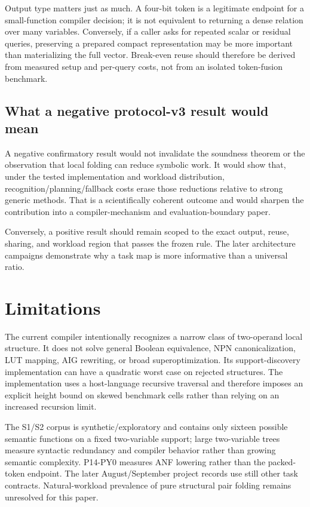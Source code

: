 \documentclass[10pt]{article}
\theoremstyle{plain}
\theoremstyle{definition}
\theoremstyle{remark}
\begin{document}
Output type matters just as much. A four-bit token is a legitimate endpoint for a small-function compiler decision; it is not equivalent to returning a dense relation over many variables. Conversely, if a caller asks for repeated scalar or residual queries, preserving a prepared compact representation may be more important than materializing the full vector. Break-even reuse should therefore be derived from measured setup and per-query costs, not from an isolated token-fusion benchmark.

\subsection{What a negative protocol-v3 result would mean}

A negative confirmatory result would not invalidate the soundness theorem or the observation that local folding can reduce symbolic work. It would show that, under the tested implementation and workload distribution, recognition/planning/fallback costs erase those reductions relative to strong generic methods. That is a scientifically coherent outcome and would sharpen the contribution into a compiler-mechanism and evaluation-boundary paper.

Conversely, a positive result should remain scoped to the exact output, reuse, sharing, and workload region that passes the frozen rule. The later architecture campaigns demonstrate why a task map is more informative than a universal ratio.

\section{Limitations}

The current compiler intentionally recognizes a narrow class of two-operand local structure. It does not solve general Boolean equivalence, NPN canonicalization, LUT mapping, AIG rewriting, or broad superoptimization. Its support-discovery implementation can have a quadratic worst case on rejected structures. The implementation uses a host-language recursive traversal and therefore imposes an explicit height bound on skewed benchmark cells rather than relying on an increased recursion limit.

The S1/S2 corpus is synthetic/exploratory and contains only sixteen possible semantic functions on a fixed two-variable support; large two-variable trees measure syntactic redundancy and compiler behavior rather than growing semantic complexity. P14-PY0 measures ANF lowering rather than the packed-token endpoint. The later August/September project records use still other task contracts. Natural-workload prevalence of pure structural pair folding remains unresolved for this paper.
\end{document}
